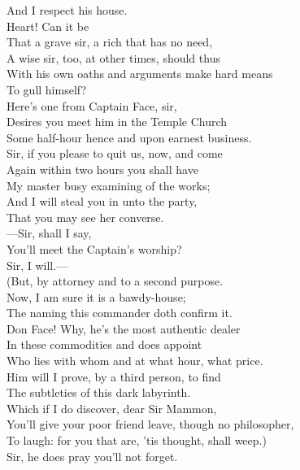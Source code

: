 \documentclass[a4paper,oneside,12pt]{memoir}
\begin{document}
\begin{drama*}
And I respect his house.\\
\surlyspeaks {} Heart! Can it be\\
That a grave sir, a rich that has no need,\\
A wise sir, too, at other times, should thus\\
With his own oaths and arguments make hard means\\
To gull himself?\\
\facespeaks {}  Here's one from Captain Face, sir,\\
Desires you meet him in the Temple Church\\
Some half-hour hence and upon earnest business.\\
Sir, if you please to quit us, now, and come\\
Again within two hours you shall have\\
My master busy examining of the works;\\
And I will steal you in unto the party,\\
That you may see her converse.\\
 ---Sir, shall I say,\\
You'll meet the Captain's worship?\\
\surlyspeaks {} Sir, I will.---\\
(But, by attorney and to a second purpose.\\
Now, I am sure it is a bawdy-house;\\
The naming this commander doth confirm it.\\
Don Face! Why, he's the most authentic dealer\\
In these commodities and does appoint\\
Who lies with whom and at what hour, what price.\\
Him will I prove, by a third person, to find\\
The subtleties of this dark labyrinth.\\
Which if I do discover, dear Sir Mammon,\\
You'll give your poor friend leave, though no philosopher,\\
To laugh: for you that are, 'tis thought, shall weep.)\\
\facespeaks Sir, he does pray you'll not forget.\\

\end{drama*}
\end{document}
